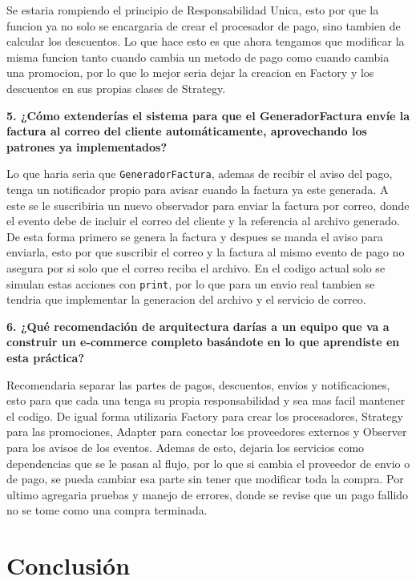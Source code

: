 \documentclass[letterpaper,11pt]{article}
\begin{document}
Se estaria rompiendo el principio de Responsabilidad Unica, esto por que la funcion ya no solo se encargaria de crear el procesador de pago, sino tambien de calcular los descuentos. Lo que hace esto es que ahora tengamos que modificar la misma funcion tanto cuando cambia un metodo de pago como cuando cambia una promocion, por lo que lo mejor seria dejar la creacion en Factory y los descuentos en sus propias clases de Strategy.

\textbf{5. ¿Cómo extenderías el sistema para que el GeneradorFactura envíe la factura al correo del cliente automáticamente, aprovechando los patrones ya implementados?}

Lo que haria seria que \texttt{GeneradorFactura}, ademas de recibir el aviso del pago, tenga un notificador propio para avisar cuando la factura ya este generada. A este se le suscribiria un nuevo observador para enviar la factura por correo, donde el evento debe de incluir el correo del cliente y la referencia al archivo generado. De esta forma primero se genera la factura y despues se manda el aviso para enviarla, esto por que suscribir el correo y la factura al mismo evento de pago no asegura por si solo que el correo reciba el archivo. En el codigo actual solo se simulan estas acciones con \texttt{print}, por lo que para un envio real tambien se tendria que implementar la generacion del archivo y el servicio de correo.

\textbf{6. ¿Qué recomendación de arquitectura darías a un equipo que va a construir un e-commerce completo basándote en lo que aprendiste en esta práctica?}

Recomendaria separar las partes de pagos, descuentos, envios y notificaciones, esto para que cada una tenga su propia responsabilidad y sea mas facil mantener el codigo. De igual forma utilizaria Factory para crear los procesadores, Strategy para las promociones, Adapter para conectar los proveedores externos y Observer para los avisos de los eventos. Ademas de esto, dejaria los servicios como dependencias que se le pasan al flujo, por lo que si cambia el proveedor de envio o de pago, se pueda cambiar esa parte sin tener que modificar toda la compra. Por ultimo agregaria pruebas y manejo de errores, donde se revise que un pago fallido no se tome como una compra terminada.

\section*{Conclusión}
\end{document}
